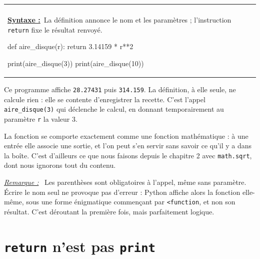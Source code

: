 \documentclass[a4paper,11pt,openany]{book}
\makeatletter
\newcommand{\code}[1]{\texttt{\textcolor{codebleu}{#1}}}
\newenvironment{cadre}%
 {\par\vspace{2mm}\noindent\begin{tabular}{|@{\hspace{4mm}}p{0.93\textwidth}@{\hspace{4mm}}|}
  \hline \\[-2mm]}%
 {\\[2mm] \hline \end{tabular}\par\vspace{3mm}}
\newcommand{\syntaxe}{\textbf{\underline{Syntaxe :}}~}
\newenvironment{remarque}%
 {\par\vspace{1mm}\begin{list}{}{\leftmargin=1cm \rightmargin=0.5cm}\item[]%
  \textit{\underline{Remarque :}}~}%
 {\end{list}\vspace{1mm}}
\makeatother
\begin{document}
\begin{cadre}
\syntaxe La définition annonce le nom et les paramètres ; l'instruction \code{return} fixe le résultat renvoyé.
\begin{python}
def aire_disque(r):
    return 3.14159 * r**2

print(aire_disque(3))
print(aire_disque(10))
\end{python}
\end{cadre}

Ce programme affiche \code{28.27431} puis \code{314.159}. La définition, à elle seule, ne calcule rien : elle se contente d'enregistrer la recette. C'est l'appel \code{aire\_disque(3)} qui déclenche le calcul, en donnant temporairement au paramètre \code{r} la valeur $3$.

\begin{center}
\end{center}

La fonction se comporte exactement comme une fonction mathématique : à une entrée elle associe une sortie, et l'on peut s'en servir sans savoir ce qu'il y a dans la boîte. C'est d'ailleurs ce que nous faisons depuis le chapitre 2 avec \code{math.sqrt}, dont nous ignorons tout du contenu.

\begin{remarque}
Les parenthèses sont obligatoires à l'appel, même sans paramètre. Écrire le nom seul ne provoque pas d'erreur : Python affiche alors la fonction elle-même, sous une forme énigmatique commençant par \code{<function}, et non son résultat. C'est déroutant la première fois, mais parfaitement logique.
\end{remarque}

\section{\texttt{return} n'est pas \texttt{print}}
\end{document}
